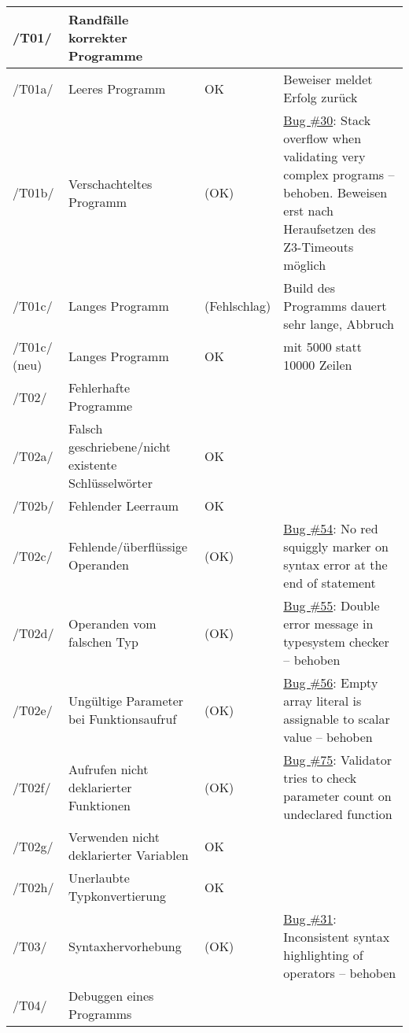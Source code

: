 \begin{landscape}
\begin{longtable}{lp{8cm}lp{10cm}}
/T01/ & Randfälle korrekter Programme &  &  \\ \midrule
/T01a/ & Leeres Programm & OK & Beweiser meldet Erfolg zurück \\ \midrule
/T01b/ & Verschachteltes Programm & (OK) & \hyperlink{https://github.com/team-worthwhile/worthwhile/issues/30}{\hyperlink{https://github.com/team-worthwhile/worthwhile/issues/30}{Bug \#30}}: Stack overflow when validating very complex programs – behoben. Beweisen erst nach Heraufsetzen des Z3-Timeouts möglich \\ \midrule
/T01c/ & Langes Programm & (Fehlschlag) & Build des Programms dauert sehr lange, Abbruch \\ \midrule
/T01c/ (neu) & Langes Programm & OK & mit 5000 statt 10000 Zeilen \\ \midrule
\midrule
/T02/ & Fehlerhafte Programme &  &  \\ \midrule
/T02a/ & Falsch geschriebene/nicht existente Schlüsselwörter & OK &  \\ \midrule
/T02b/ & Fehlender Leerraum & OK &  \\ \midrule
/T02c/ & Fehlende/überflüssige Operanden & (OK) & \hyperlink{https://github.com/team-worthwhile/worthwhile/issues/54}{Bug \#54}: No red squiggly marker on syntax error at the end of statement \\ \midrule
/T02d/ & Operanden vom falschen Typ & (OK) & \hyperlink{https://github.com/team-worthwhile/worthwhile/issues/55}{Bug \#55}: Double error message in typesystem checker – behoben \\ \midrule
/T02e/ & Ungültige Parameter bei Funktionsaufruf & (OK) & \hyperlink{https://github.com/team-worthwhile/worthwhile/issues/56}{Bug \#56}: Empty array literal is assignable to scalar value – behoben \\ \midrule
/T02f/ & Aufrufen nicht deklarierter Funktionen & (OK) & \hyperlink{https://github.com/team-worthwhile/worthwhile/issues/75}{Bug \#75}: Validator tries to check parameter count on undeclared function \\ \midrule
/T02g/ & Verwenden nicht deklarierter Variablen & OK &  \\ \midrule
/T02h/ & Unerlaubte Typkonvertierung & OK &  \\ \midrule
\midrule
/T03/ & Syntaxhervorhebung & (OK) & \hyperlink{https://github.com/team-worthwhile/worthwhile/issues/31}{Bug \#31}: Inconsistent syntax highlighting of operators – behoben \\ \midrule
\midrule
/T04/ & Debuggen eines Programms &  &  \\ \midrule

\end{longtable}
\end{landscape}
